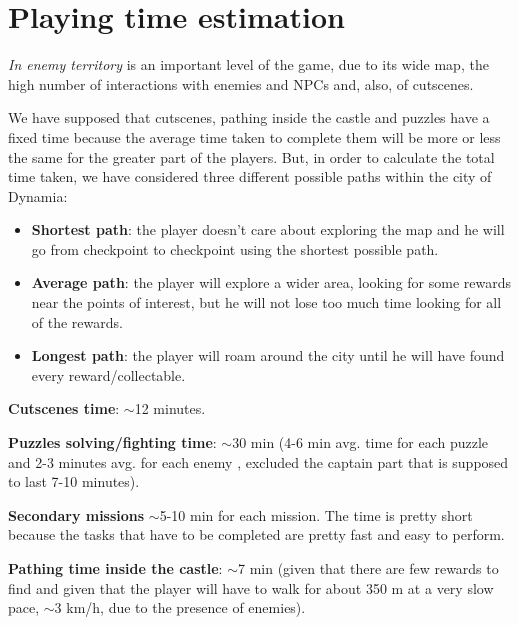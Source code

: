 \section{Playing time estimation}

\textit{In enemy territory} is an important level of the game, due to its wide map, the high number of interactions with enemies and NPCs and, also, of cutscenes.

We have supposed that cutscenes, pathing inside the castle and puzzles have a fixed time because the average time taken to complete them will be more or less the same for the greater part of the players. But, in order to calculate the total time taken, we have considered three different possible paths within the city of Dynamia:
\begin{itemize}
\item \textbf{Shortest path}: the player doesn't care about exploring the map and he will go from checkpoint to checkpoint using the shortest possible path.
\item \textbf{Average path}: the player will explore a wider area, looking for some rewards near the points of interest, but he will not lose too much time looking for all of the rewards.
\item \textbf{Longest path}: the player will roam around the city until he will have found every reward/collectable.
\end{itemize}
\textbf{Cutscenes time}: $\sim$12 minutes.

\textbf{Puzzles solving/fighting time}: $\sim$30 min (4-6 min avg. time for each puzzle and 2-3 minutes avg. for each enemy , excluded the captain part that is supposed to last 7-10 minutes).

\textbf{Secondary missions} $\sim$5-10 min for each mission. The time is pretty short because the tasks that have to be completed are pretty fast and  easy to perform.

\textbf{Pathing time inside the castle}: $\sim$7 min (given that there are few rewards to find and given that the player will have to walk for about 350 m at a very slow pace, $\sim$3 km/h, due to the presence of enemies).


